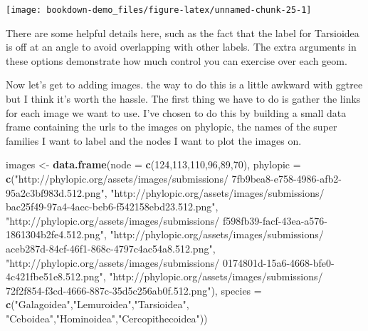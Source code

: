 \documentclass[]{book}
\newenvironment{Shaded}{\begin{snugshade}}{\end{snugshade}}
\newcommand{\KeywordTok}[1]{\textcolor[rgb]{0.13,0.29,0.53}{\textbf{#1}}}
\newcommand{\DataTypeTok}[1]{\textcolor[rgb]{0.13,0.29,0.53}{#1}}
\newcommand{\DecValTok}[1]{\textcolor[rgb]{0.00,0.00,0.81}{#1}}
\newcommand{\StringTok}[1]{\textcolor[rgb]{0.31,0.60,0.02}{#1}}
\newcommand{\NormalTok}[1]{#1}
\begin{document}
\begin{center}\texttt{[image: bookdown-demo\_files/figure-latex/unnamed-chunk-25-1]} \end{center}

There are some helpful details here, such as the fact that the label for
Tarsioidea is off at an angle to avoid overlapping with other labels.
The extra arguments in these options demonstrate how much control you
can exercise over each geom.

Now let's get to adding images. the way to do this is a little awkward
with ggtree but I think it's worth the hassle. The first thing we have
to do is gather the links for each image we want to use. I've chosen to
do this by building a small data frame containing the urls to the images
on phylopic, the names of the super families I want to label and the
nodes I want to plot the images on.

\begin{Shaded}
\begin{Highlighting}[]
\NormalTok{images <-}\StringTok{ }\KeywordTok{data.frame}\NormalTok{(}\DataTypeTok{node =} \KeywordTok{c}\NormalTok{(}\DecValTok{124}\NormalTok{,}\DecValTok{113}\NormalTok{,}\DecValTok{110}\NormalTok{,}\DecValTok{96}\NormalTok{,}\DecValTok{89}\NormalTok{,}\DecValTok{70}\NormalTok{),}
                     \DataTypeTok{phylopic =} \KeywordTok{c}\NormalTok{(}\StringTok{"http://phylopic.org/assets/images/submissions/}
\StringTok{                                  7fb9bea8-e758-4986-afb2-95a2c3bf983d.512.png"}\NormalTok{,}
                                  \StringTok{"http://phylopic.org/assets/images/submissions/}
\StringTok{                                  bac25f49-97a4-4aec-beb6-f542158ebd23.512.png"}\NormalTok{,}
                                  \StringTok{"http://phylopic.org/assets/images/submissions/}
\StringTok{                                  f598fb39-facf-43ea-a576-1861304b2fe4.512.png"}\NormalTok{,}
                                  \StringTok{"http://phylopic.org/assets/images/submissions/}
\StringTok{                                  aceb287d-84cf-46f1-868c-4797c4ac54a8.512.png"}\NormalTok{,}
                                  \StringTok{"http://phylopic.org/assets/images/submissions/}
\StringTok{                                  0174801d-15a6-4668-bfe0-4c421fbe51e8.512.png"}\NormalTok{,}
                                  \StringTok{"http://phylopic.org/assets/images/submissions/}
\StringTok{                                  72f2f854-f3cd-4666-887c-35d5c256ab0f.512.png"}\NormalTok{),}
                     \DataTypeTok{species =} \KeywordTok{c}\NormalTok{(}\StringTok{"Galagoidea"}\NormalTok{,}\StringTok{"Lemuroidea"}\NormalTok{,}\StringTok{"Tarsioidea"}\NormalTok{,}
                                 \StringTok{"Ceboidea"}\NormalTok{,}\StringTok{"Hominoidea"}\NormalTok{,}\StringTok{"Cercopithecoidea"}\NormalTok{))}
\end{Highlighting}
\end{Shaded}
\end{document}
